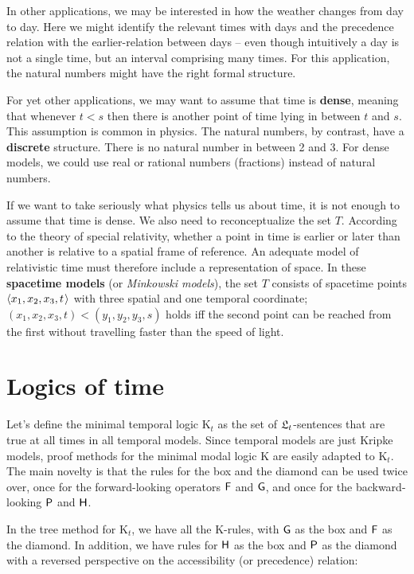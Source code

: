 In other applications, we may be interested in how the weather changes from day
to day. Here we might identify the relevant times with days and the precedence
relation with the earlier-relation between days -- even though intuitively a day
is not a single time, but an interval comprising many times. For this
application, the natural numbers might have the right formal structure.

For yet other applications, we may want to assume that time is \textbf{dense},
meaning that whenever $t < s$ then there is another point of time lying in
between $t$ and $s$. This assumption is common in physics. The natural numbers,
by contrast, have a \textbf{discrete} structure. There is no natural number in
between 2 and 3. For dense models, we could use real or rational numbers
(fractions) instead of natural numbers.


If we want to take seriously what physics tells us about time, it is not enough
to assume that time is dense. We also need to reconceptualize the set $T$.
According to the theory of special relativity, whether a point in time is
earlier or later than another is relative to a spatial frame of reference. An
adequate model of relativistic time must therefore include a representation of
space. In these \textbf{spacetime models} (or \emph{Minkowski models}), the set
$T$ consists of spacetime points $\t{x_1,x_2,x_3,t}$ with three spatial and one
temporal coordinate; $(x_1,x_2,x_3,t) < (y_1,y_2,y_3,s)$ holds iff the second
point can be reached from the first without travelling faster than the speed of
light.

\section{Logics of time}

Let's define the minimal temporal logic K$_t$ as the set of $\mathfrak{L}_{t}$-sentences
that are true at all times in all temporal models. Since temporal models are
just Kripke models, proof methods for the minimal modal logic K are easily
adapted to K$_{t}$. The main novelty is that the rules for the box and the
diamond can be used twice over, once for the forward-looking operators $\operatorname{\mathsf{F}}$ and
$\operatorname{\mathsf{G}}$, and once for the backward-looking $\operatorname{\mathsf{P}}$ and $\operatorname{\mathsf{H}}$.

In the tree method for K$_{t}$, we have all the K-rules, with $\operatorname{\mathsf{G}}$ as the box
and $\operatorname{\mathsf{F}}$ as the diamond. In addition, we have rules for $\operatorname{\mathsf{H}}$ as the box and
$\operatorname{\mathsf{P}}$ as the diamond with a reversed perspective on the accessibility (or
precedence) relation:


